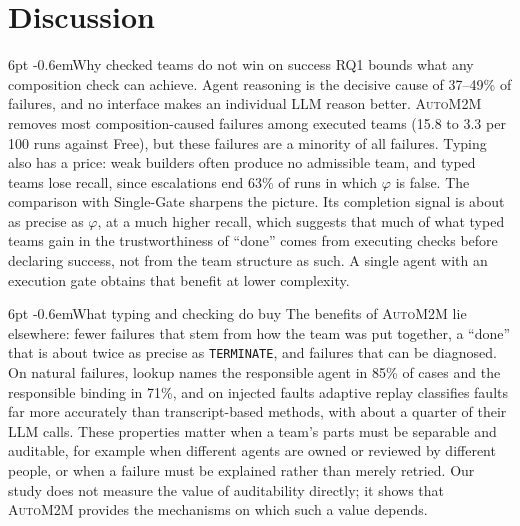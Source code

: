 \documentclass[pdflatex,sn-mathphys-num]{sn-jnl}
\makeatletter
\theoremstyle{thmstyleone}%
\theoremstyle{thmstyletwo}%
\theoremstyle{thmstylethree}%
\newcommand{\auto}{\textsc{AutoM2M}}
\newcommand{\code}[1]{\texttt{#1}}
\renewcommand\paragraph{\@startsection{paragraph}{4}{\z@}%
  {6pt \@plus 2pt \@minus 1pt}{-0.6em}{\normalfont\normalsize\bfseries}}
\makeatother
\begin{document}
\section{Discussion}\label{sec:discussion}

\paragraph{Why checked teams do not win on success} RQ1 bounds what any
composition check can achieve. Agent reasoning is the decisive cause of
37--49\% of failures, and no interface makes an individual LLM reason better.
\auto{} removes most composition-caused failures among executed teams (15.8 to
3.3 per 100 runs against Free), but these failures are a minority of all
failures. Typing also has a price: weak builders often produce no admissible
team, and typed teams lose recall, since escalations end 63\% of runs in which
$\varphi$ is false.
The comparison with Single-Gate sharpens the picture. Its completion signal is
about as precise as $\varphi$, at a much higher recall, which suggests that
much of what typed teams gain in the trustworthiness of ``done'' comes from
executing checks before declaring success, not from the team structure as such.
A single agent with an execution gate obtains that benefit at lower complexity.

\paragraph{What typing and checking do buy} The benefits of \auto{} lie
elsewhere: fewer failures that stem from how the team was put together, a
``done'' that is about twice as precise as \code{TERMINATE}, and failures that
can be diagnosed. On natural failures, lookup names the responsible agent in
85\% of cases and the responsible binding in 71\%, and on injected faults
adaptive replay classifies faults far more accurately than transcript-based
methods, with about a quarter of their LLM calls. These
properties matter when a team's parts must be separable and auditable, for
example when different agents are owned or reviewed by different people, or
when a failure must be explained rather than merely retried. Our study does not
measure the value of auditability directly; it shows that \auto{} provides
the mechanisms on which such a value depends.
\end{document}
